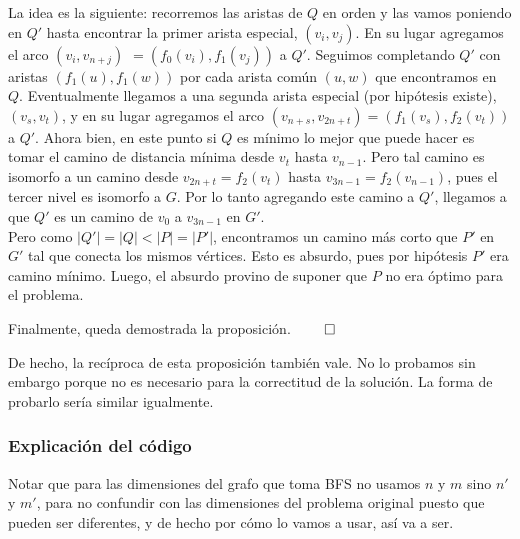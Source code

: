 \begin{itemize}
	 La idea es la siguiente: recorremos las aristas de $Q$ en orden y las vamos poniendo en $Q'$ hasta encontrar la primer arista especial, $(v_i, v_j)$. En su lugar agregamos el arco $(v_i, v_{n+j})$ $=(f_0(v_i), f_1(v_j))$ a $Q'$. Seguimos completando $Q'$ con aristas $(f_1(u), f_1(w))$ por cada arista común $(u,w)$ que encontramos en $Q$. Eventualmente llegamos a una segunda arista especial (por hipótesis existe), $(v_s, v_t)$, y en su lugar agregamos el arco $(v_{n+s}, v_{2n+t}) = (f_1(v_s), f_2(v_t))$ a $Q'$. Ahora bien, en este punto si $Q$ es mínimo lo mejor que puede hacer es tomar el camino de distancia mínima desde $v_t$ hasta $v_{n-1}$. Pero tal camino es isomorfo a un camino desde $v_{2n+t}=f_2(v_t)$ hasta $v_{3n-1}=f_2(v_{n-1})$, pues el tercer nivel es isomorfo a $G$. Por lo tanto agregando este camino a $Q'$, llegamos a que $Q'$ es un camino de $v_0$ a $v_{3n-1}$ en $G'$. \\
	 Pero como $|Q'|=|Q|<|P|=|P'|$, encontramos un camino más corto que $P'$ en $G'$ tal que conecta los mismos vértices. Esto es absurdo, pues por hipótesis $P'$ era camino mínimo. Luego, el absurdo provino de suponer que $P$ no era óptimo para el problema.
\end{itemize}

Finalmente, queda demostrada la proposición. $\qed$

De hecho, la recíproca de esta proposición también vale. No lo probamos sin embargo porque no es necesario para la correctitud de la solución. La forma de probarlo sería similar igualmente.

\subsubsection{Explicación del código}

Notar que para las dimensiones del grafo que toma BFS no usamos $n$ y $m$ sino $n'$ y $m'$, para no confundir con las dimensiones del problema original puesto que pueden ser diferentes, y de hecho por cómo lo vamos a usar, así va a ser.


